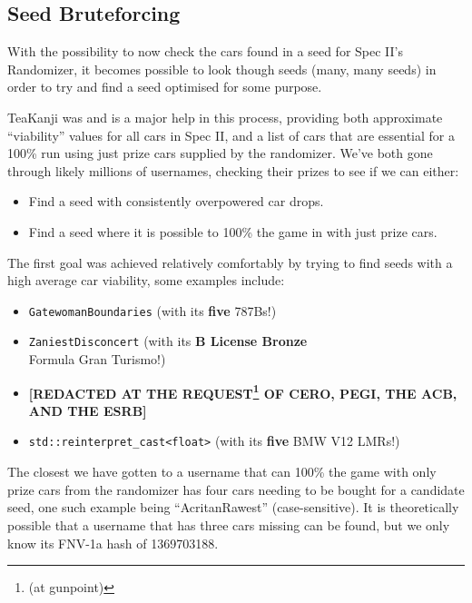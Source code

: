 \documentclass[14pt,a4paper,notitlepage]{extarticle}
\begin{document}
        \subsection*{Seed Bruteforcing}
            With the possibility to now check the cars found in a seed for Spec II's
            Randomizer, it becomes possible to look though seeds (many, many seeds) in order
            to try and find a seed optimised for some purpose.

            TeaKanji was and is a major help in this process, providing both approximate
            ``viability'' values for all cars in Spec II, and a list of cars that are essential
            for a 100\% run using just prize cars supplied by the randomizer. We've both gone
            through likely millions of usernames, checking their prizes to see if we can either:

            \begin{itemize}
                \item Find a seed with consistently overpowered car drops.
                \item Find a seed where it is possible to 100\% the game in with just prize cars.
            \end{itemize}

            The first goal was achieved relatively comfortably by trying to find seeds with
            a high average car viability, some examples include:

            \begin{itemize}
                \item \texttt{GatewomanBoundaries} (with its \textbf{five} 787Bs!)
                \item \texttt{ZaniestDisconcert} (with its \textbf{B License Bronze}\\Formula
                Gran Turismo!)
                \item \textbf{[REDACTED AT THE REQUEST\footnote{(at gunpoint)} OF CERO, PEGI,
                THE ACB, AND THE ESRB]}
                \item \texttt{std::reinterpret\_cast<float>} (with its \textbf{five} BMW V12
                LMRs!)
            \end{itemize}

            The closest we have gotten to a username that can 100\% the game with only prize cars
            from the randomizer has four cars needing to be bought for a candidate seed, one such
            example being ``AcritanRawest'' (case-sensitive). It is theoretically possible that a
            username that has three cars missing can be found, but we only know its FNV-1a hash of
            1369703188.
\end{document}
